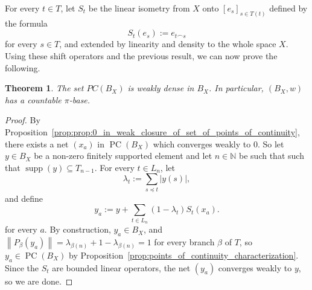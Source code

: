 \documentclass[11pt,a4paper,reqno]{amsart}
\numberwithin{equation}{section}
\newcommand{\abs}[1]{\left\lvert#1\right\rvert}
\newcommand{\norm}[1]{\left\lVert#1\right\rVert}
\newcommand{\N}{\mathbb{N}}
\DeclareMathOperator{\supp}{supp}
\DeclareMathOperator{\PC}{PC}
\newcommand{\1}{\mathbbm{1}}
\theoremstyle{plain}
\newtheorem{theorem}{Theorem}[section]
\theoremstyle{definition}
\begin{document}
For every $t\in T$, let $S_t$ be the linear isometry from $X$ onto $[e_s]_{s\in T(t)}$ defined by the formula \begin{equation*}
    S_t(e_s):=e_{t\smallfrown s}
\end{equation*} for every $s\in T$, and extended by linearity and density to the whole space $X$. Using these shift operators and the previous result, we can now prove the following.

\begin{theorem}\label{thm:weak_density_PC(B_X)}
    The set $PC(B_X)$ is weakly dense in $B_X$. In particular, $(B_X,w)$ has a countable $\pi$-base.
\end{theorem}

\begin{proof}
 By Proposition~\ref{prop:prop:0_in_weak_closure_of_set_of_points_of_continuity}, there exists a net $(x_a)$ in $\PC(B_X)$ which converges weakly to 0. So let $y\in B_X$ be a non-zero finitely supported element and let $n\in\N$ be such that such that $\supp(y)\subseteq T_{n-1}$. For every $t\in L_n$, let \begin{equation*}
     \lambda_t:=\sum_{s\preceq t}\abs{y(s)},
 \end{equation*} and define \begin{equation*}
     y_a:=y+\sum_{t\in L_n}(1-\lambda_t)S_t(x_a).
 \end{equation*} for every $a$. By construction, $y_a\in B_X$, and $\norm{P_\beta(y_a)}=\lambda_{\beta(n)}+1-\lambda_{\beta(n)}=1$ for every branch $\beta$ of $T$, so $y_a\in \PC(B_X)$ by Proposition~\ref{prop:points_of_continuity_characterization}. Since the $S_t$ are bounded linear operators, the net $(y_a)$ converges weakly to $y$, so we are done. 
\end{proof}
\end{document}
